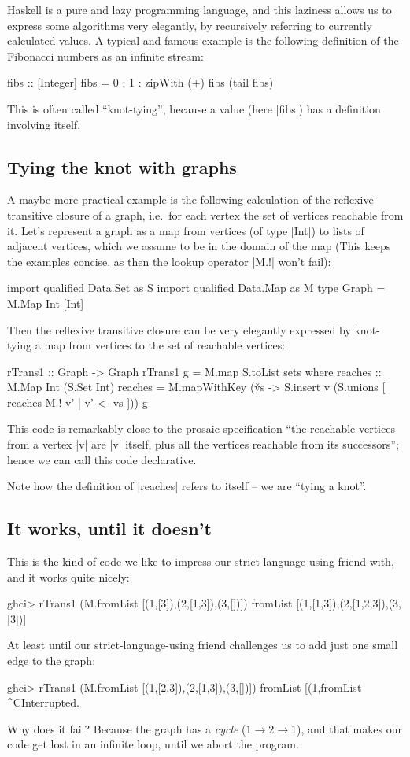 \documentclass[manuscript,anonymous,screen,acmsmall]{acmart}
\begin{document}
Haskell is a pure and lazy programming language, and this laziness allows us to express some algorithms very elegantly, by recursively referring to currently calculated values. A typical and famous example is the following definition of the Fibonacci numbers as an infinite stream:
\begin{code}
fibs :: [Integer]
fibs = 0 : 1 : zipWith (+) fibs (tail fibs)
\end{code}
This is often called “knot-tying”, because a value (here |fibs|) has a definition involving itself.

\subsection{Tying the knot with graphs}

A maybe more practical example is the following calculation of the reflexive transitive closure of a graph, i.e.\ for each vertex the set of vertices reachable from it. Let's represent a graph as a map from vertices (of type |Int|) to lists of adjacent vertices, which we assume to be in the domain of the map (This keeps the examples concise, as then the lookup operator |M.!| won't fail):
\begin{code}
import qualified Data.Set as S
import qualified Data.Map as M
type Graph = M.Map Int [Int]
\end{code}

Then the reflexive transitive closure can be very elegantly expressed by knot-tying a map from vertices to the set of reachable vertices:
\begin{code}
rTrans1 :: Graph -> Graph
rTrans1 g = M.map S.toList sets
  where
    reaches :: M.Map Int (S.Set Int)
    reaches = M.mapWithKey (\v vs -> S.insert v (S.unions [ reaches M.! v' | v' <- vs ])) g
\end{code}
This code is remarkably close to the prosaic specification “the reachable vertices from a vertex |v| are |v| itself, plus all the vertices reachable from its successors”; hence we can call this code declarative.

Note how the definition of |reaches| refers to itself -- we are “tying a knot”.

\subsection{It works, until it doesn't}

This is the kind of code we like to impress our strict-language-using friend with, and it works quite nicely:
\begin{code}
ghci> rTrans1 (M.fromList [(1,[3]),(2,[1,3]),(3,[])])
fromList [(1,[1,3]),(2,[1,2,3]),(3,[3])]
\end{code}
%
At least until our strict-language-using friend challenges us to add just one small edge to the graph:
\begin{code}
ghci> rTrans1 (M.fromList [(1,[2,3]),(2,[1,3]),(3,[])])
fromList [(1,fromList ^CInterrupted.
\end{code}
Why does it fail? Because the graph has a \emph{cycle} ($1 \to 2 \to 1$), and that makes our code get lost in an infinite loop, until we abort the program.
\end{document}
